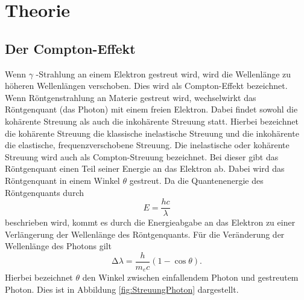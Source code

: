 \section{Theorie}
\label{sec:Theorie}



\subsection{Der Compton-Effekt}
\label{sec:comptoneffekt}
Wenn $\gamma$ -Strahlung an einem Elektron gestreut wird, wird die Wellenlänge zu höheren Wellenlängen verschoben.
Dies wird als Compton-Effekt bezeichnet.
Wenn Röntgenstrahlung an Materie gestreut wird, wechselwirkt das Röntgenquant (das Photon) mit einem freien Elektron.
Dabei findet sowohl die kohärente Streuung als auch die inkohärente Streuung statt. Hierbei bezeichnet die kohärente Streuung
die klassische inelastische Streuung und die inkohärente die elastische, frequenzverschobene Streuung.
Die inelastische oder kohärente Streuung wird auch als Compton-Streuung bezeichnet.
Bei dieser gibt das Röntgenquant einen Teil seiner Energie an das Elektron ab. Dabei wird das Röntgenquant in einem Winkel $\theta$
gestreut. Da die Quantenenergie des Röntgenquants durch
\begin{equation}
	E =  \frac{h c}{\lambda}
	\label{eqn:E=hc/lambda}
\end{equation}
beschrieben wird, kommt es durch die Energieabgabe an das Elektron zu einer Verlängerung der Wellenlänge des Röntgenquants.
Für die Veränderung der Wellenlänge des Photons gilt
\begin{equation}
	\increment \lambda = \frac{h}{m_e c} (1- \cos  \theta).
	\label{eqn:deltalambda}
\end{equation}
Hierbei bezeichnet $\theta$ den Winkel zwischen einfallendem Photon und gestreutem Photon. Dies ist in Abbildung \ref{fig:StreuungPhoton}
dargestellt.

